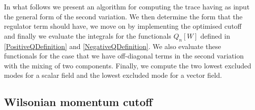 \documentclass[notitlepage,eqsecnum,bm,amsmath,preprintnumbers,superscriptaddress,nofootinbib,aps,11pt]{revtex4-1}
\begin{document}
In what follows we present an algorithm for computing the trace having as input the general form of the second variation. 
We then determine the form that the regulator term should have, we move on by implementing the optimised cutoff and finally we 
evaluate the integrals for the functionals $Q_n[W]$ defined in \eqref{PositiveQDefinition} and \eqref{NegativeQDefinition}. 
We also evaluate these functionals for the case that we have off-diagonal terms in the second variation with the mixing of 
two components. Finally, we compute the two lowest excluded modes for a scalar field and the lowest excluded mode for a vector field.

\subsection{Wilsonian momentum cutoff}
\label{subsec:TheRegulatorTerm}
\end{document}
